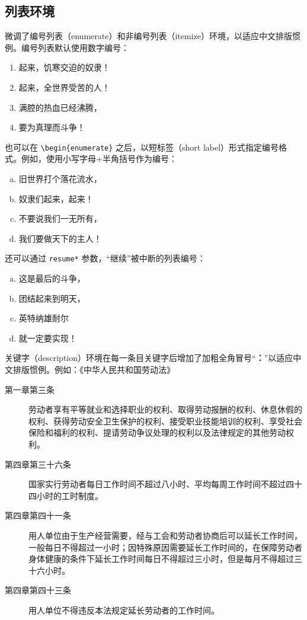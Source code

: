 \documentclass[master]{shtthesis}
\begin{document}
\subsection{列表环境}
\shtthesis{} 微调了编号列表（enumerate）和非编号列表（itemize）环境，以适应中文排版惯例。编号列表默认使用数字编号：
\begin{enumerate}
  \item 起来，饥寒交迫的奴隶！
  \item 起来，全世界受苦的人！
  \item 满腔的热血已经沸腾，
  \item 要为真理而斗争！
\end{enumerate}
也可以在 \verb|\begin{enumerate}| 之后，以短标签（short label）形式指定编号格式。例如，使用小写字母+半角括号作为编号：
\begin{enumerate}[a)]
  \item 旧世界打个落花流水，
  \item 奴隶们起来，起来！
  \item 不要说我们一无所有，
  \item 我们要做天下的主人！
\end{enumerate}
还可以通过 \verb|resume*| 参数，“继续”被中断的列表编号：
\begin{enumerate}[a), resume*]
  \item 这是最后的斗争，
  \item 团结起来到明天，
  \item 英特纳雄耐尔
  \item 就一定要实现！
\end{enumerate}

关键字（description）环境在每一条目关键字后增加了加粗全角冒号“\textbf{：}”以适应中文排版惯例。例如：《中华人民共和国劳动法》
\begin{description}
  \item[第一章第三条] 劳动者享有平等就业和选择职业的权利、取得劳动报酬的权利、休息休假的权利、获得劳动安全卫生保护的权利、接受职业技能培训的权利、享受社会保险和福利的权利、提请劳动争议处理的权利以及法律规定的其他劳动权利。
  \item[第四章第三十六条] 国家实行劳动者每日工作时间不超过八小时、平均每周工作时间不超过四十四小时的工时制度。
  \item[第四章第四十一条] 用人单位由于生产经营需要，经与工会和劳动者协商后可以延长工作时间，一般每日不得超过一小时；因特殊原因需要延长工作时间的，在保障劳动者身体健康的条件下延长工作时间每日不得超过三小时，但是每月不得超过三十六小时。
  \item[第四章第四十三条] 用人单位不得违反本法规定延长劳动者的工作时间。   
\end{description}
\end{document}
